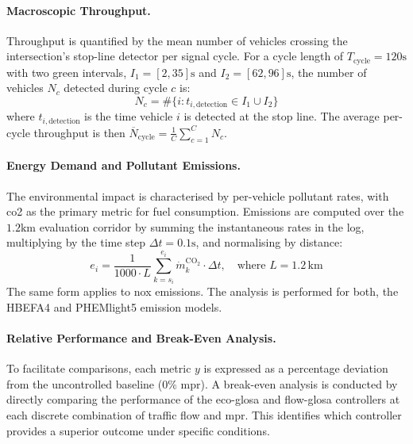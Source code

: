 \paragraph{Macroscopic Throughput.}
Throughput is quantified by the mean number of vehicles crossing the intersection's stop-line detector per signal cycle. For a cycle length of $T_{\mathrm{cycle}}=120\unit{\second}$ with two green intervals, $I_{1}=[2,35]\unit{\second}$ and $I_{2}=[62,96]\unit{\second}$, the number of vehicles $N_{c}$ detected during cycle $c$ is:
\begin{equation}
    N_{c} = \#\lbrace i : t_{i,\mathrm{detection}} \in I_{1} \cup I_{2} \rbrace
\end{equation}
where $t_{i,\mathrm{detection}}$ is the time vehicle $i$ is detected at the stop line. The average per-cycle throughput is then $\overline{N}_{\mathrm{cycle}} = \frac{1}{C}\sum_{c=1}^{C} N_{c}$.

\paragraph{Energy Demand and Pollutant Emissions.}
The environmental impact is characterised by per-vehicle pollutant rates, with \ac{co2} as the primary metric for fuel consumption. Emissions are computed over the $1.2\unit{\kilo\metre}$ evaluation corridor by summing the instantaneous rates in the log, multiplying by the time step $\Delta t = 0.1\unit{\second}$, and normalising by distance:
\begin{equation}
    e_{i} = \frac{1}{1000 \cdot L} \sum_{k=s_i}^{e_i} \dot{m}^{\mathrm{CO_2}}_{k} \cdot \Delta t, \quad \text{where } L = 1.2\,\mathrm{km}
\end{equation}
The same form applies to \ac{nox} emissions. The analysis is performed for both, the HBEFA4 and PHEMlight5 emission models.

\paragraph{Relative Performance and Break-Even Analysis.}
To facilitate comparisons, each metric $y$ is expressed as a percentage deviation from the uncontrolled baseline (0\% \ac{mpr}). A break-even analysis is conducted by directly comparing the performance of the \ac{eco-glosa} and \ac{flow-glosa} controllers at each discrete combination of traffic flow and \ac{mpr}. This identifies which controller provides a superior outcome under specific conditions.

